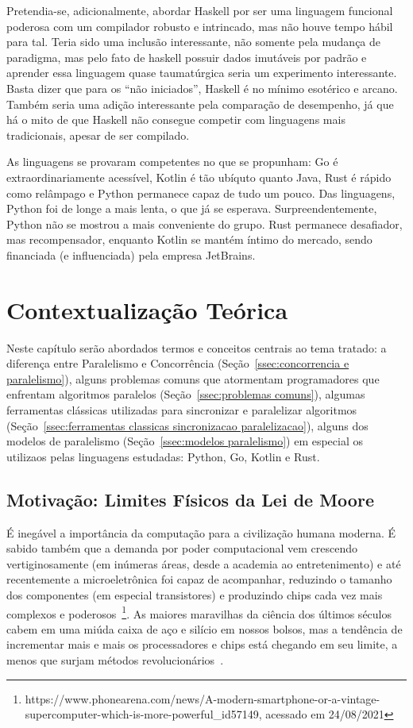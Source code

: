 \documentclass[12pt,a4paper]{article}
\begin{document}
Pretendia-se, adicionalmente, abordar Haskell por ser uma linguagem funcional poderosa com um compilador robusto e intrincado, mas não houve tempo hábil para tal. Teria sido uma inclusão interessante, não somente pela mudança de paradigma, mas pelo fato de haskell possuir dados imutáveis por padrão e aprender essa linguagem quase taumatúrgica seria um experimento interessante. Basta dizer que para os ``não iniciados'', Haskell é no mínimo esotérico e arcano. Também seria uma adição interessante pela comparação de desempenho, já que há o mito de que Haskell não consegue competir com linguagens mais tradicionais, apesar de ser compilado.

As linguagens se provaram competentes no que se propunham: Go é extraordinariamente acessível, Kotlin é tão ubíquto quanto Java, Rust é rápido como relâmpago e Python permanece capaz de tudo um pouco. Das linguagens, Python foi de longe a mais lenta, o que já se esperava. Surpreendentemente, Python não se mostrou a mais conveniente do grupo. Rust permanece desafiador, mas recompensador, enquanto Kotlin se mantém íntimo do mercado, sendo financiada (e influenciada) pela empresa JetBrains.


\newpage
\section{Contextualização Teórica}

Neste capítulo serão abordados termos e conceitos centrais ao tema tratado: a diferença entre Paralelismo e Concorrência (Seção~\ref{ssec:concorrencia e paralelismo}), alguns problemas comuns que atormentam programadores que enfrentam algoritmos paralelos (Seção~\ref{ssec:problemas comuns}), algumas ferramentas clássicas utilizadas para sincronizar e paralelizar algoritmos (Seção~\ref{ssec:ferramentas classicas sincronizacao paralelizacao}), alguns dos modelos de paralelismo (Seção~\ref{ssec:modelos paralelismo}) em especial os utilizaos pelas linguagens estudadas: Python, Go, Kotlin e Rust.

\subsection{Motivação: Limites Físicos da Lei de Moore}

É inegável a importância da computação para a civilização humana moderna. É sabido também que a demanda por poder computacional vem crescendo vertiginosamente (em inúmeras áreas, desde a academia ao entretenimento) e até recentemente a microeletrônica foi capaz de acompanhar, reduzindo o tamanho dos componentes (em especial transistores) e produzindo chips cada vez mais complexos e poderosos~\footnote{https://www.phonearena.com/news/A-modern-smartphone-or-a-vintage-supercomputer-which-is-more-powerful\_id57149, acessado em 24/08/2021}. As maiores maravilhas da ciência dos últimos séculos cabem em uma miúda caixa de aço e silício em nossos bolsos, mas a tendência de incrementar mais e mais os processadores e chips está chegando em seu limite, a menos que surjam métodos revolucionários~\cite{powell2008quantum}.
\end{document}
